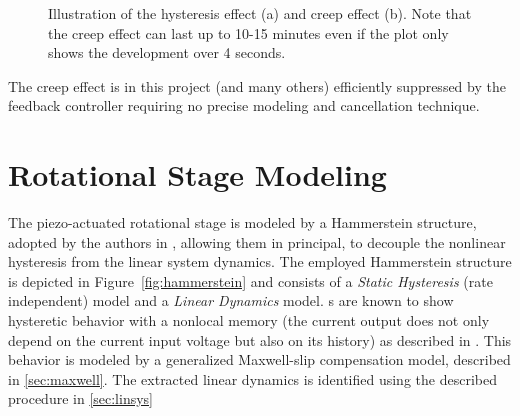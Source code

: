 \begin{figure}[h!]
  \centering %
  \qquad
  \caption{\label{fig:effects} Illustration of the hysteresis effect (a) and creep effect (b). Note that the creep effect can last up to 10-15 minutes even if the plot only shows the development over 4 seconds.}
\end{figure}

The creep effect is in this project (and many others) efficiently suppressed by the feedback controller requiring no precise modeling and cancellation technique.

\section{Rotational Stage Modeling}
The piezo-actuated rotational stage is modeled by a Hammerstein structure, adopted by the authors in \citep{ButcherController:2015}, allowing them in principal, to decouple the nonlinear hysteresis from the linear system dynamics. The employed Hammerstein structure is depicted in Figure~\ref{fig:hammerstein} and consists of a \emph{Static Hysteresis} (rate independent) model and a \emph{Linear Dynamics} model. {\abbrPEA}s are known to show hysteretic behavior with a nonlocal memory (the current output does not only depend on the current input voltage but also on its history) as described in \citep{ButcherIdentification:2015}. This behavior is modeled by a generalized Maxwell-slip compensation model, described in \ref{sec:maxwell}. The extracted linear dynamics is identified using the described procedure in \ref{sec:linsys}

